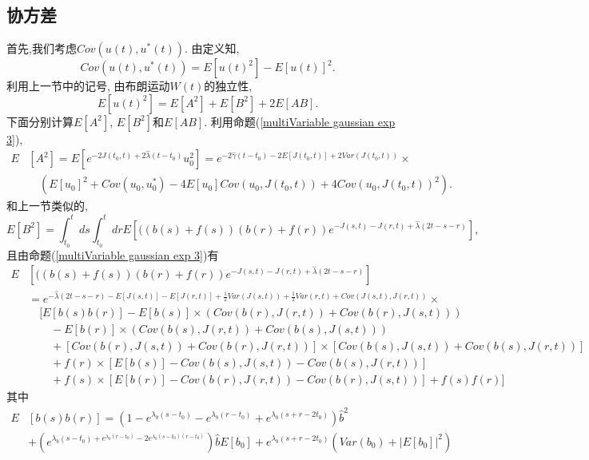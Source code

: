 \documentclass[notitlepage,cs4size,punct,oneside]{ctexrep}
\numberwithin{equation}{section}
\theoremstyle{mystyle}
\begin{document}
\subsection{协方差}
首先,我们考虑$Cov(u(t), u^*(t))$.
由定义知,{}
$$
Cov(u(t), u^*(t)) = E\left[u(t)^2\right]-E[u(t)]^2.
$$
利用上一节中的记号, 由布朗运动$W(t)$的独立性,
\begin{equation}
E[u(t)^2] = E[A^2]+E[B^2]+2E[AB].
\end{equation}
下面分别计算$E[A^2]$, $E[B^2]$和$E[AB]$.
利用命题(\ref{multiVariable gaussian exp 3}),
\begin{equation}
\begin{split}
E&[A^2] = E[e^{-2J(t_0, t)+2\hat\lambda(t-t_0)}u_0^2] = e^{-2\hat\gamma(t-t_0)-2E[J(t_0, t)]+2Var(J(t_0, t))}\times \\
&\quad\left(E[u_0]^2+Cov(u_0, u_0^*)-4E[u_0]Cov(u_0, J(t_0, t))+4Cov(u_0, J(t_0, t))^2\right).
\end{split}
\end{equation}
和上一节类似的,
$$
E\left[B^2\right] = \int_{t_0}^t ds \int_{t_0}^t dr E\left[((b(s)+f(s))(b(r)+f(r))e^{-J(s, t)-J(r, t)+\hat\lambda(2t-s-r)}\right],
$$
且由命题(\ref{multiVariable gaussian exp 3})有
\begin{equation}
\begin{split}
E&\left[((b(s)+f(s))(b(r)+f(r))e^{-J(s, t)-J(r, t)+\hat\lambda(2t-s-r)}\right] \\
&= e^{-\hat\lambda(2t-s-r)-E[J(s, t)]-E[J(r, t)]+\frac{1}{2}Var(J(s, t))+\frac{1}{2}Var(r, t)+Cov(J(s, t), J(r, t))} \times \\
&\quad [E[b(s)b(r)]-E[b(s)]\times(Cov(b(r), J(r, t))+Cov(b(r), J(s, t))) \\
&\quad\quad- E[b(r)]\times(Cov(b(s), J(r, t))+Cov(b(s), J(s, t))) \\
&\quad\quad + [Cov(b(r), J(s, t))+Cov(b(r), J(r, t))]\times[Cov(b(s), J(s, t))+Cov(b(s), J(r, t))]\\
&\quad\quad + f(r)\times[E[b(s)]-Cov(b(s), J(s, t))-Cov(b(s), J(r, t))]\\
&\quad\quad +f(s)\times[E[b(r)]-Cov(b(r), J(r, t))-Cov(b(r), J(s, t))]+f(s)f(r)]
\end{split}
\end{equation}
其中
\begin{equation}
\begin{split}
E&[b(s)b(r)] = \left(1-e^{\lambda_b(s-t_0)}-e^{\lambda_b(r-t_0)}+e^{\lambda_b(s+r-2t_0)}\right)\hat{b}^2 \\
&+ \left(e^{\lambda_b(s-t_0)+e^{\lambda_b(r-t_0)}-2e^{\lambda_b(s-t_0)(r-t_0)}}\right)\hat{b}E[b_0] + e^{\lambda_b(s+r-2t_0)}\left(Var(b_0)+|E[b_0]|^2\right)
\end{split}
\end{equation}
\end{document}
